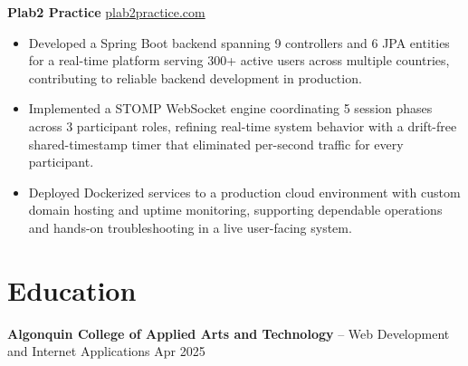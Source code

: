 \documentclass[11pt]{article}       %
\begin{document}
\textbf{Plab2 Practice} \hfill \href{https://plab2practice.com}{plab2practice.com} \\
\vspace{-9pt}
\begin{itemize}
  \item Developed a Spring Boot backend spanning 9 controllers and 6 JPA entities for a real-time platform serving 300+ active users across multiple countries, contributing to reliable backend development in production.
  \item Implemented a STOMP WebSocket engine coordinating 5 session phases across 3 participant roles, refining real-time system behavior with a drift-free shared-timestamp timer that eliminated per-second traffic for every participant.
  \item Deployed Dockerized services to a production cloud environment with custom domain hosting and uptime monitoring, supporting dependable operations and hands-on troubleshooting in a live user-facing system.
\end{itemize}





\section*{Education}
\textbf{Algonquin College of Applied Arts and Technology} -- Web Development and Internet Applications
\hfill Apr 2025 \\
\end{document}
